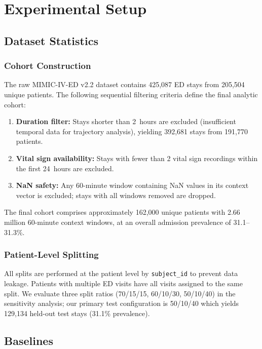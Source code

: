 \documentclass[runningheads]{llncs}
\begin{document}
\section{Experimental Setup}

\subsection{Dataset Statistics}

\subsubsection{Cohort Construction}
The raw MIMIC-IV-ED v2.2 dataset contains 425,087 ED stays from 205,504 unique patients. The following sequential filtering criteria define the final analytic cohort:

\begin{enumerate}
    \item \textbf{Duration filter:} Stays shorter than 2~hours are excluded (insufficient temporal data for trajectory analysis), yielding 392,681 stays from 191,770 patients.
    \item \textbf{Vital sign availability:} Stays with fewer than 2 vital sign recordings within the first 24~hours are excluded.
    \item \textbf{NaN safety:} Any 60-minute window containing NaN values in its context vector is excluded; stays with all windows removed are dropped.
\end{enumerate}

The final cohort comprises approximately 162,000 unique patients with 2.66 million 60-minute context windows, at an overall admission prevalence of 31.1--31.3\%.

\subsubsection{Patient-Level Splitting}
All splits are performed at the patient level by \texttt{subject\_id} to prevent data leakage. Patients with multiple ED visits have all visits assigned to the same split. We evaluate three split ratios (70/15/15, 60/10/30, 50/10/40) in the sensitivity analysis; our primary test configuration is 50/10/40 which yields 129,134 held-out test stays (31.1\% prevalence).

\subsection{Baselines}
\end{document}
